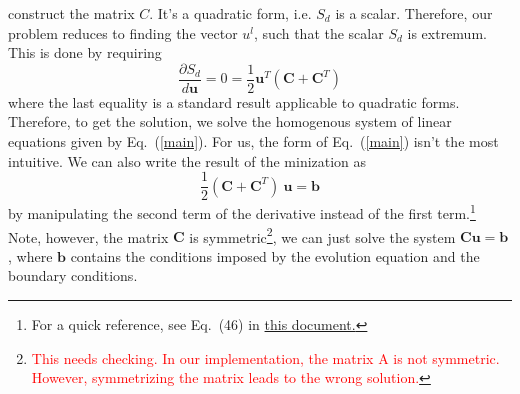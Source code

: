 \documentclass[nofootinbib,preprintnumbers,superscriptaddress,notitlepage]{revtex4-1}
\newcommand{\<}{\begin{equation}}
\newcommand{\?}{\end{equation}}
\begin{document}
construct the matrix $C$. It's a quadratic form, i.e. $S_d$ is a scalar.
Therefore, our problem reduces to finding the vector $u^l$, such that the
scalar $S_d$ is extremum. This is done by requiring
\begin{equation}
\label{main}
\dfrac{\partial S_d}{d\mathbf{u}} = 0 = \dfrac{1}{2}\mathbf{u}^T (\mathbf{C} + \mathbf{C}^T)
\end{equation}
where the last equality is a standard result applicable to quadratic forms.
Therefore, to get the solution, we solve the homogenous system of linear
equations given by Eq.~(\ref{main}). For us, the form of Eq.~(\ref{main})
isn't the most intuitive. We can also write the result of the minization as
\begin{equation}
\label{solve}
\dfrac{1}{2}(\mathbf{C} + \mathbf{C}^T)~\mathbf{u} = \mathbf{b} 
\end{equation}
by manipulating the second term of the derivative instead of the first
term.\footnote{For a quick reference, see Eq.~(46) in
\href{http://www.atmos.washington.edu/~dennis/MatrixCalculus.pdf}{this
document.}} Note, however, the matrix $\mathbf{C}$ is
symmetric\footnote{\textcolor{red}{This needs checking. In our implementation,
the matrix A is not symmetric. However, symmetrizing the matrix leads to the
wrong solution.}}, we can just solve the system $\mathbf{C}\mathbf{u} =
\mathbf{b}  $, where $\mathbf{b} $ contains the conditions imposed by the
evolution equation and the boundary conditions.\\
\end{document}
